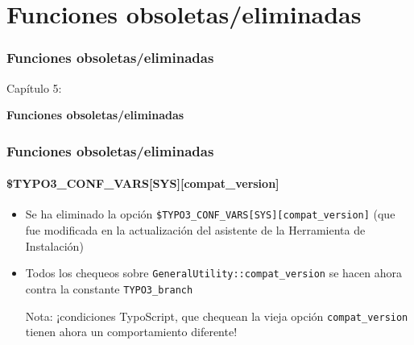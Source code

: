 %

\section{Funciones obsoletas/eliminadas}
\begin{frame}[fragile]
	\frametitle{Funciones obsoletas/eliminadas}

	\begin{center}\huge{Capítulo 5:}\end{center}
	\begin{center}\huge{\color{typo3darkgrey}\textbf{Funciones obsoletas/eliminadas}}\end{center}

\end{frame}


\begin{frame}[fragile]
	\frametitle{Funciones obsoletas/eliminadas}
	\framesubtitle{\$TYPO3\_CONF\_VARS[SYS][compat\_version]}

	\begin{itemize}

		\item Se ha eliminado la opción \texttt{\$TYPO3\_CONF\_VARS[SYS][compat\_version]} (que fue modificada en
			la actualización del asistente de la Herramienta de Instalación)

		\item Todos los chequeos sobre \texttt{GeneralUtility::compat\_version} se hacen ahora contra
			la constante \texttt{TYPO3\_branch}

			\vspace{0.2cm}

			\begingroup
				\color{red}
					Nota: ¡condiciones TypoScript, que chequean la vieja opción \texttt{compat\_version}
					tienen ahora un comportamiento diferente!
			\endgroup

	\end{itemize}

\end{frame}

